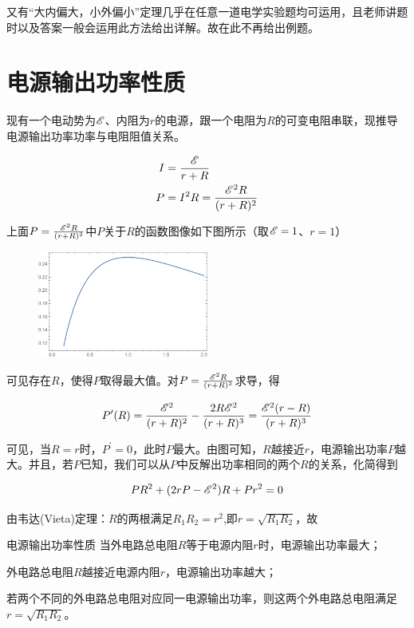 又有“大内偏大，小外偏小”定理几乎在任意一道电学实验题均可运用，且老师讲题时以及答案一般会运用此方法给出详解。故在此不再给出例题。

\section{电源输出功率性质}
\label{s_wdlzdgl}

现有一个电动势为$\mathscr{E}$、内阻为$r$的电源，跟一个电阻为$R$的可变电阻串联，现推导电源输出功率功率与电阻阻值关系。

\begin{subequations}
\begin{align*}
I &= \frac{\mathscr{E}}{r + R} \\
P &= I^2 R = \frac{\mathscr{E}^2 R}{(r + R)^2}
\end{align*}
\end{subequations}

上面$P = \frac{\mathscr{E}^2 R}{(r + R)^2}$中$P$关于$R$的函数图像如下图所示（取$\mathscr{E} = 1$、$r = 1$）

\begin{figure}[htbp]
\centering
\includegraphics[width=0.5\textwidth]{pic_eled/zdgl_p1.pdf}
\end{figure}

可见存在$R$，使得$P$取得最大值。对$P = \frac{\mathscr{E}^2 R}{(r + R)^2}$求导，得

$$P^{\prime}(R) = \frac{\mathscr{E}^2}{(r+R)^2}-\frac{2 R \mathscr{E}^2}{(r+R)^3} = \frac{\mathscr{E}^2 (r-R)}{(r+R)^3}$$

可见，当$R=r$时，$P^{\prime} = 0$，此时$P$最大。由图可知，$R$越接近$r$，电源输出功率$P$越大。并且，若$P$已知，我们可以从$P$中反解出功率相同的两个$R$的关系，化简得到

$$P R^2 + (2 r P - \mathscr{E}^2)R + P r^2 = 0$$

由韦达(Vieta)定理：$R$的两根满足$R_1 R_2 = r^2$,即$r = \sqrt{R_1 R_2}$，故

\begin{theo}{电源输出功率性质}{}
当外电路总电阻$R$等于电源内阻$r$时，电源输出功率最大；

外电路总电阻$R$越接近电源内阻$r$，电源输出功率越大；

若两个不同的外电路总电阻对应同一电源输出功率，则这两个外电路总电阻满足$r = \sqrt{R_1 R_2}$。
\end{theo}

